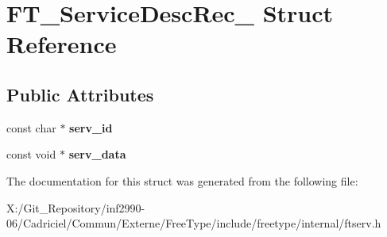 \hypertarget{struct_f_t___service_desc_rec__}{\section{F\-T\-\_\-\-Service\-Desc\-Rec\-\_\- Struct Reference}
\label{struct_f_t___service_desc_rec__}
}
\subsection*{Public Attributes}
\begin{DoxyCompactItemize}
\item 
\hypertarget{struct_f_t___service_desc_rec___ab706270db01e1398233571f10bd249d4}{const char $\ast$ {\bfseries serv\-\_\-id}}\label{struct_f_t___service_desc_rec___ab706270db01e1398233571f10bd249d4}

\item 
\hypertarget{struct_f_t___service_desc_rec___aa597a33a2b0d099ec32882dc6aa38d59}{const void $\ast$ {\bfseries serv\-\_\-data}}\label{struct_f_t___service_desc_rec___aa597a33a2b0d099ec32882dc6aa38d59}

\end{DoxyCompactItemize}


The documentation for this struct was generated from the following file\-:\begin{DoxyCompactItemize}
\item 
X\-:/\-Git\-\_\-\-Repository/inf2990-\/06/\-Cadriciel/\-Commun/\-Externe/\-Free\-Type/include/freetype/internal/ftserv.\-h\end{DoxyCompactItemize}
